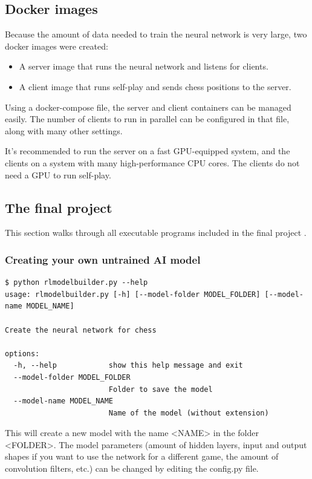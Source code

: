 \documentclass{article}
\begin{document}
\subsection{Docker images}

Because the amount of data needed to train the neural network is very large, two docker images were created:

\begin{itemize}
    \item A server image that runs the neural network and listens for clients.
    \item A client image that runs self-play and sends chess positions to the server.
\end{itemize}

Using a docker-compose file, the server and client containers can be managed easily. The number of clients 
to run in parallel can be configured in that file, along with many other settings.

It's recommended to run the server on a fast GPU-equipped system, and the clients on a system with many high-performance CPU cores.
The clients do not need a GPU to run self-play.

\subsection{The final project}

This section walks through all executable programs included in the final project \cite{zjefferChessEngineDeep2022}.

\subsubsection{Creating your own untrained AI model}

\begin{verbatim}
$ python rlmodelbuilder.py --help
usage: rlmodelbuilder.py [-h] [--model-folder MODEL_FOLDER] [--model-name MODEL_NAME]

Create the neural network for chess

options:
  -h, --help            show this help message and exit
  --model-folder MODEL_FOLDER
                        Folder to save the model
  --model-name MODEL_NAME
                        Name of the model (without extension)
\end{verbatim}

This will create a new model with the name <NAME> in the folder <FOLDER>.
The model parameters (amount of hidden layers, input and output shapes if you want to use the network for a different game, the amount of convolution filters, etc.)
can be changed by editing the config.py file.
\end{document}
